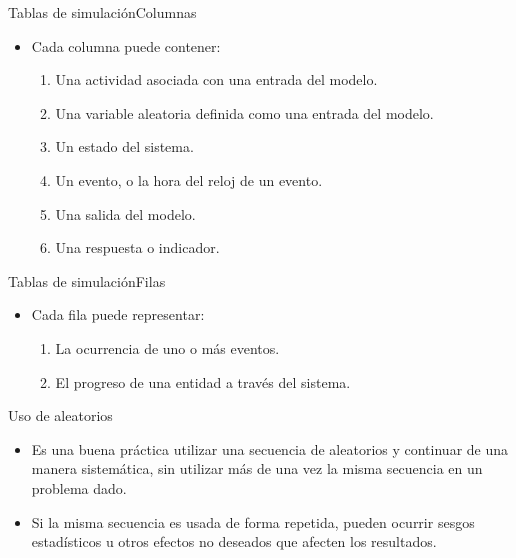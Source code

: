 \begin{frame}{Tablas de simulación}{Columnas}
    \begin{itemize}
        \item Cada columna puede contener:
        \begin{enumerate}
            \item Una actividad asociada con una entrada del modelo.
            \item Una variable aleatoria definida como una entrada del modelo.
            \item Un estado del sistema.
            \item Un evento, o la hora del reloj de un evento.
            \item Una salida del modelo.
            \item Una respuesta o indicador.
        \end{enumerate}
    \end{itemize}
\end{frame}

\begin{frame}{Tablas de simulación}{Filas}
    \begin{itemize}
        \item Cada fila puede representar:
        \begin{enumerate}
            \item La ocurrencia de uno o más eventos.
            \item El progreso de una entidad a través del sistema.
        \end{enumerate}
    \end{itemize}
\end{frame}

\begin{frame}{Uso de aleatorios}
    \begin{itemize}
        \item Es una buena práctica utilizar una secuencia de aleatorios y continuar de una manera sistemática, sin utilizar más de una vez la misma secuencia en un problema dado.
        \item Si la misma secuencia es usada de forma repetida, pueden ocurrir sesgos estadísticos u otros efectos no deseados que afecten los resultados.
    \end{itemize}
\end{frame}